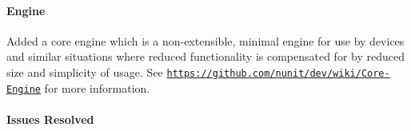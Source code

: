 \paragraph*{Engine}


\begin{DoxyItemize}
\item Added a core engine which is a non-\/extensible, minimal engine for use by devices and similar situations where reduced functionality is compensated for by reduced size and simplicity of usage. See \href{https://github.com/nunit/dev/wiki/Core-Engine}{\tt https\+://github.\+com/nunit/dev/wiki/\+Core-\/\+Engine} for more information.
\end{DoxyItemize}

\paragraph*{Issues Resolved}


